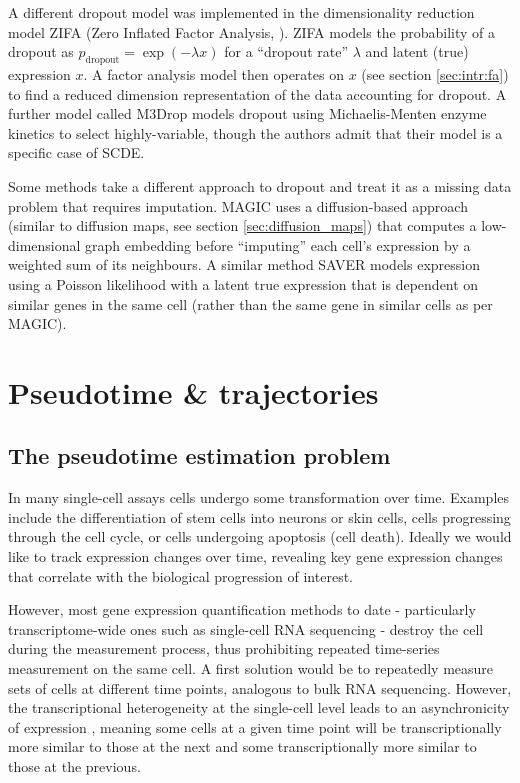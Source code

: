 A different dropout model was implemented in the dimensionality reduction model ZIFA (Zero Inflated Factor Analysis, \cite{pierson2015zifa}). ZIFA models the probability of a dropout as $p_{\text{dropout}} = \exp(-\lambda x)$ for a ``dropout rate'' $\lambda$ and latent (true) expression $x$. A factor analysis model then operates on $x$ (see section \ref{sec:intr:fa}) to find a reduced dimension representation of the data accounting for dropout. A further model called M3Drop \cite{Andrews2016-ij} models dropout using Michaelis-Menten enzyme kinetics to select highly-variable, though the authors admit that their model is a specific case of SCDE.

Some methods take a different approach to dropout and treat it as a missing data problem that requires imputation. MAGIC \cite{Van_Dijk2017-wn} uses a diffusion-based approach (similar to diffusion maps, see section \ref{sec:diffusion_maps}) that computes a low-dimensional graph embedding before ``imputing'' each cell's expression by a weighted sum of its neighbours. A similar method SAVER \cite{SAVER} models expression using a Poisson likelihood with a latent true expression that is dependent on similar genes in the same cell (rather than the same gene in similar cells as per MAGIC).

\section{Pseudotime \& trajectories} \label{sec:pseudotime}


\subsection{The pseudotime estimation problem}

In many single-cell assays cells undergo some transformation over time. Examples include the differentiation of stem cells into neurons or skin cells, cells progressing through the cell cycle, or cells undergoing apoptosis (cell death). Ideally we would like to track expression changes over time, revealing key gene expression changes that correlate with the biological progression of interest.

However, most gene expression quantification methods to date - particularly transcriptome-wide ones such as single-cell RNA sequencing - destroy the cell during the measurement process, thus prohibiting repeated time-series measurement on the same cell. A first solution would be to repeatedly measure sets of cells at different time points, analogous to bulk RNA sequencing. However, the transcriptional heterogeneity at the single-cell level leads to an asynchronicity of expression \cite{Trapnell2014-xi}, meaning some cells at a given time point will be transcriptionally more similar to those at the next and some transcriptionally more similar to those at the previous.

